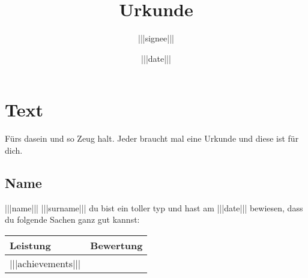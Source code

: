 \documentclass[a4paper]{article}
\title{Urkunde}
\author{|||signee|||}
\date{|||date|||}
\begin{document}
\maketitle
\section{Text}

Fürs dasein und so Zeug halt. Jeder braucht mal eine Urkunde und diese ist für dich.

\subsection{Name}

|||name||| |||surname||| du bist ein toller typ und hast am |||date||| bewiesen, dass du folgende Sachen ganz gut kannst:

  \begin{tabular}{ l | c }
    \hline
    Leistung & Bewertung \\ \hline
    |||achievements|||
  \end{tabular}
\end{document}
